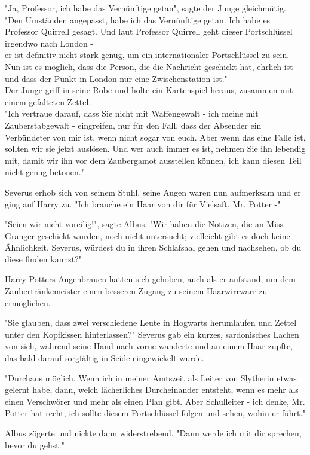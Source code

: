 {"Ja, Professor, ich habe das Vernünftige getan", sagte der Junge gleichmütig. "Den Umständen angepasst, habe ich das Vernünftige getan. Ich habe es Professor Quirrell gesagt. Und laut Professor Quirrell geht dieser Portschlüssel irgendwo nach London -\\ er ist definitiv nicht stark genug, um ein internationaler Portschlüssel zu sein. Nun ist es möglich, dass die Person, die die Nachricht geschickt hat, ehrlich ist und dass der Punkt in London nur eine Zwischenstation ist."\\ Der Junge griff in seine Robe und holte ein Kartenspiel heraus, zusammen mit einem gefalteten Zettel.\\ "Ich vertraue darauf, dass Sie nicht mit Waffengewalt - ich meine mit Zauberstabgewalt - eingreifen, nur für den Fall, dass der Absender ein Verbündeter von mir ist, wenn nicht sogar von euch. Aber wenn das eine Falle ist, sollten wir sie jetzt auslösen. Und wer auch immer es ist, nehmen Sie ihn lebendig mit, damit wir ihn vor dem Zaubergamot ausstellen können, ich kann diesen Teil nicht genug betonen."

Severus erhob sich von seinem Stuhl, seine Augen waren nun aufmerksam und er ging auf Harry zu. "Ich brauche ein Haar von dir für Vielsaft, Mr. Potter -"

"Seien wir nicht voreilig!", sagte Albus. "Wir haben die Notizen, die an Miss Granger geschickt wurden, noch nicht untersucht; vielleicht gibt es doch keine Ähnlichkeit. Severus, würdest du in ihren Schlafsaal gehen und nachsehen, ob du diese finden kannst?"

Harry Potters Augenbrauen hatten sich gehoben, auch als er aufstand, um dem Zaubertränkemeister einen besseren Zugang zu seinem Haarwirrwarr zu ermöglichen.

"Sie glauben, dass zwei verschiedene Leute in Hogwarts herumlaufen und Zettel unter den Kopfkissen hinterlassen?" Severus gab ein kurzes, sardonisches Lachen von sich, während seine Hand nach vorne wanderte und an einem Haar zupfte, das bald darauf sorgfältig in Seide eingewickelt wurde.

"Durchaus möglich. Wenn ich in meiner Amtszeit als Leiter von Slytherin etwas gelernt habe, dann, welch lächerliches Durcheinander entsteht, wenn es mehr als einen Verschwörer und mehr als einen Plan gibt. Aber Schulleiter - ich denke, Mr. Potter hat recht, ich sollte diesem Portschlüssel folgen und sehen, wohin er führt."

Albus zögerte und nickte dann widerstrebend. "Dann werde ich mit dir sprechen, bevor du gehst."

}

